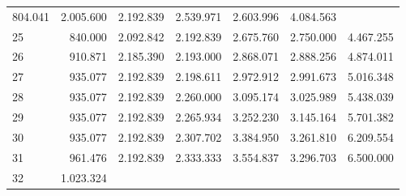 \begin{tabular}{lllllll}
  \multicolumn{1}{|r}{804.041} &
  \multicolumn{1}{r}{2.005.600} &
  \multicolumn{1}{r}{2.192.839} &
  \multicolumn{1}{r}{2.539.971} &
  \multicolumn{1}{r}{2.603.996} &
  \multicolumn{1}{r}{4.084.563} \\
\multicolumn{1}{l}{\hspace{1em}25} &
  \multicolumn{1}{|r}{840.000} &
  \multicolumn{1}{r}{2.092.842} &
  \multicolumn{1}{r}{2.192.839} &
  \multicolumn{1}{r}{2.675.760} &
  \multicolumn{1}{r}{2.750.000} &
  \multicolumn{1}{r}{4.467.255} \\
\multicolumn{1}{l}{\hspace{1em}26} &
  \multicolumn{1}{|r}{910.871} &
  \multicolumn{1}{r}{2.185.390} &
  \multicolumn{1}{r}{2.193.000} &
  \multicolumn{1}{r}{2.868.071} &
  \multicolumn{1}{r}{2.888.256} &
  \multicolumn{1}{r}{4.874.011} \\
\multicolumn{1}{l}{\hspace{1em}27} &
  \multicolumn{1}{|r}{935.077} &
  \multicolumn{1}{r}{2.192.839} &
  \multicolumn{1}{r}{2.198.611} &
  \multicolumn{1}{r}{2.972.912} &
  \multicolumn{1}{r}{2.991.673} &
  \multicolumn{1}{r}{5.016.348} \\
\multicolumn{1}{l}{\hspace{1em}28} &
  \multicolumn{1}{|r}{935.077} &
  \multicolumn{1}{r}{2.192.839} &
  \multicolumn{1}{r}{2.260.000} &
  \multicolumn{1}{r}{3.095.174} &
  \multicolumn{1}{r}{3.025.989} &
  \multicolumn{1}{r}{5.438.039} \\
\multicolumn{1}{l}{\hspace{1em}29} &
  \multicolumn{1}{|r}{935.077} &
  \multicolumn{1}{r}{2.192.839} &
  \multicolumn{1}{r}{2.265.934} &
  \multicolumn{1}{r}{3.252.230} &
  \multicolumn{1}{r}{3.145.164} &
  \multicolumn{1}{r}{5.701.382} \\
\multicolumn{1}{l}{\hspace{1em}30} &
  \multicolumn{1}{|r}{935.077} &
  \multicolumn{1}{r}{2.192.839} &
  \multicolumn{1}{r}{2.307.702} &
  \multicolumn{1}{r}{3.384.950} &
  \multicolumn{1}{r}{3.261.810} &
  \multicolumn{1}{r}{6.209.554} \\
\multicolumn{1}{l}{\hspace{1em}31} &
  \multicolumn{1}{|r}{961.476} &
  \multicolumn{1}{r}{2.192.839} &
  \multicolumn{1}{r}{2.333.333} &
  \multicolumn{1}{r}{3.554.837} &
  \multicolumn{1}{r}{3.296.703} &
  \multicolumn{1}{r}{6.500.000} \\
\multicolumn{1}{l}{\hspace{1em}32} &
  \multicolumn{1}{|r}{1.023.324} &

\end{tabular}
